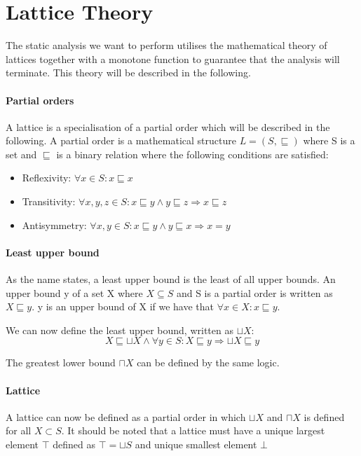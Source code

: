 \section{Lattice Theory}\label{lattice}
The static analysis we want to perform utilises the mathematical theory of lattices together with a monotone function to guarantee that the analysis will terminate.
This theory will be described in the following.

\paragraph{Partial orders}
A lattice is a specialisation of a partial order which will be described in the following.
A partial order is a mathematical structure $L = (S, \sqsubseteq)$ where S is a set and $\sqsubseteq$ is a binary relation where the following conditions are satisfied:
\begin{itemize}
  \item Reflexivity: $\forall x \in S : x \sqsubseteq x$
  \item Transitivity: $\forall x,y,z \in S : x \sqsubseteq y \wedge y \sqsubseteq z \Rightarrow x \sqsubseteq z$
  \item Antisymmetry: $\forall x,y \in S: x \sqsubseteq y \wedge y \sqsubseteq x \Rightarrow x = y$
\end{itemize}


\paragraph{Least upper bound}
As the name states, a least upper bound is the least of all upper bounds.
An upper bound y of a set X where $ X \subseteq S$ and S is a partial order is written as $X \sqsubseteq y$.
y is an upper bound of X if we have that $\forall x \in X : x \sqsubseteq y$.

We can now define the least upper bound, written as $\sqcup X$:
\[X \sqsubseteq \sqcup X \wedge \forall y \in S : X \sqsubseteq y \Rightarrow \sqcup X \sqsubseteq y\]

The greatest lower bound $\sqcap X$ can be defined by the same logic.

\paragraph{Lattice}
A lattice can now be defined as a partial order in which $\sqcup X$ and $\sqcap X$ is defined for all $X \subset S$.
It should be noted  that a lattice must have a unique largest element $\top$ defined as $\top = \sqcup S$ and unique smallest element $\bot$ 

